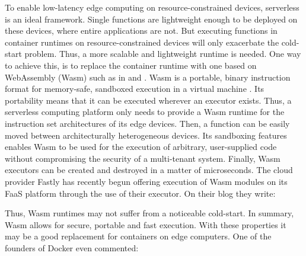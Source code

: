 \medskip

To enable low-latency edge computing on resource-constrained devices, serverless is an ideal framework. Single functions are lightweight enough to be deployed on these devices, where entire applications are not. But executing functions in container runtimes on resource-constrained devices will only exacerbate the cold-start problem. Thus, a more scalable and lightweight runtime is needed. One way to achieve this, is to replace the container runtime with one based on WebAssembly (Wasm) such as in \cite{Hall2019} and \cite{Murphy2020}. Wasm is a portable, binary instruction format for memory-safe, sandboxed execution in a virtual machine \cite{W3C2020}. Its portability means that it can be executed wherever an executor exists. Thus, a serverless computing platform only needs to provide a Wasm runtime for the instruction set architectures of its edge devices. Then, a function can be easily moved between architecturally heterogeneous devices. Its sandboxing features enables Wasm to be used for the execution of arbitrary, user-supplied code without compromising the security of a multi-tenant system. Finally, Wasm executors can be created and destroyed in a matter of microseconds. The cloud provider Fastly has recently begun offering execution of Wasm modules on its FaaS platform through the use of their  executor. On their blog they write:

\begin{quote}
   \cite{fastly2019}
\end{quote}

Thus, Wasm runtimes may not suffer from a noticeable cold-start.
In summary, Wasm allows for secure, portable and fast execution. With these properties it may be a good replacement for containers on edge computers. One of the founders of Docker even commented:

\begin{quote}
   \cite{Hykes2019}
\end{quote}

